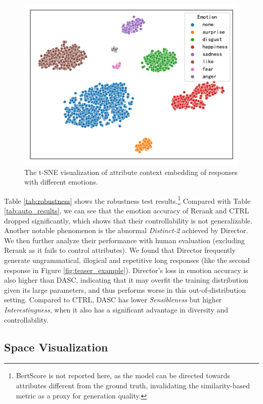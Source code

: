 \begin{figure}[t]
    \centering
    \includegraphics[width=1.0\columnwidth]{figures/emotion_context_emb.pdf}
    \caption{The t-SNE visualization of attribute context embedding of responses with different emotions.}
    \label{fig:emotion_context_emb}
\end{figure}

Table \ref{tab:robustness} shows the robustness test results.\footnote{BertScore is not reported here, as the model can be directed towards attributes different from the ground truth, invalidating the similarity-based metric as a proxy for generation quality.} Compared with Table \ref{tab:auto_results}, we can see that the emotion accuracy of Rerank and CTRL dropped significantly, which shows that their controllability is not generalizable. Another notable phenomenon is the abnormal \textit{Distinct-2} achieved by Director. We then further analyze their performance with human evaluation (excluding Rerank as it fails to control attributes). We found that Director frequently generate ungrammatical, illogical and repetitive long responses (like the second response in Figure \ref{fig:teaser_example}). Director's loss in emotion accuracy is also higher than DASC, indicating that it may overfit the training distribution given its large parameters, and thus performs worse in this out-of-distribution setting. Compared to CTRL, DASC has lower \textit{Sensibleness} but higher \textit{Interestingness}, when it also has a significant advantage in diversity and controllability. 


\subsection{Space Visualization}

